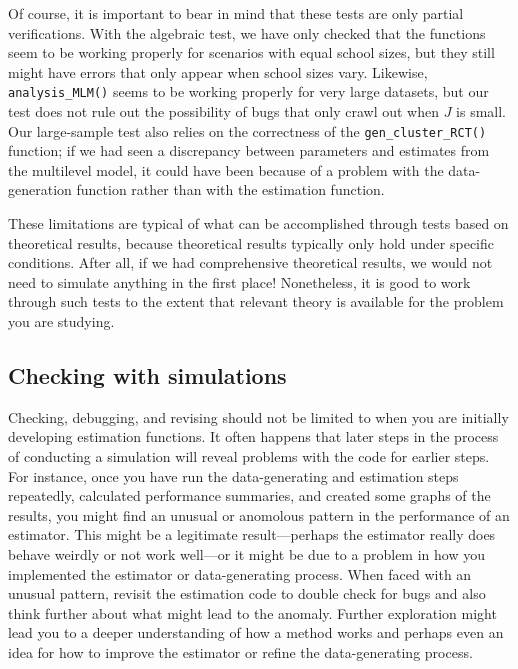 \documentclass[
]{book}
\begin{document}
Of course, it is important to bear in mind that these tests are only partial verifications.
With the algebraic test, we have only checked that the functions seem to be working properly for scenarios with equal school sizes, but they still might have errors that only appear when school sizes vary.
Likewise, \texttt{analysis\_MLM()} seems to be working properly for very large datasets, but our test does not rule out the possibility of bugs that only crawl out when \(J\) is small.
Our large-sample test also relies on the correctness of the \texttt{gen\_cluster\_RCT()} function;
if we had seen a discrepancy between parameters and estimates from the multilevel model, it could have been because of a problem with the data-generation function rather than with the estimation function.

These limitations are typical of what can be accomplished through tests based on theoretical results, because theoretical results typically only hold under specific conditions.
After all, if we had comprehensive theoretical results, we would not need to simulate anything in the first place!
Nonetheless, it is good to work through such tests to the extent that relevant theory is available for the problem you are studying.

\subsection{Checking with simulations}\label{checking-with-simulations}

Checking, debugging, and revising should not be limited to when you are initially developing estimation functions.
It often happens that later steps in the process of conducting a simulation will reveal problems with the code for earlier steps.
For instance, once you have run the data-generating and estimation steps repeatedly, calculated performance summaries, and created some graphs of the results, you might find an unusual or anomolous pattern in the performance of an estimator.
This might be a legitimate result---perhaps the estimator really does behave weirdly or not work well---or it might be due to a problem in how you implemented the estimator or data-generating process.
When faced with an unusual pattern, revisit the estimation code to double check for bugs and also think further about what might lead to the anomaly.
Further exploration might lead you to a deeper understanding of how a method works and perhaps even an idea for how to improve the estimator or refine the data-generating process.
\end{document}
